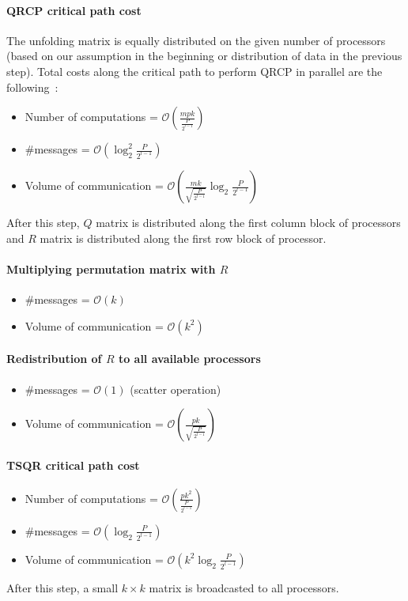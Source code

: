 \documentclass[sigconf]{acmart}
\begin{document}
\paragraph{QRCP critical path cost}
The unfolding matrix is equally distributed on the given number of processors (based on our assumption in the beginning or distribution of data in the previous step). Total costs along the critical path to perform QRCP in parallel are the following~\cite{beaupere-tournamentpivoting}:
\begin{itemize}
	\item Number of computations = $\mathcal{O}(\frac{mpk}{\frac{P}{2^{l-1}}})$
	\item \#messages = $\mathcal{O}(\log_2^2\frac{P}{2^{l-1}})$
	\item Volume of communication = $\mathcal{O}(\frac{mk}{\sqrt{\frac{P}{2^{l-1}}}} \log_2 \frac{P}{2^{l-1}} )$
\end{itemize}
After this step, $Q$ matrix is distributed along the first column block of processors and $R$ matrix is distributed along the first row block of processor.

\paragraph{Multiplying permutation matrix with $R$}
\begin{itemize}
	\item \#messages = $\mathcal{O}(k)$
	\item Volume of communication = $\mathcal{O}(k^2)$
\end{itemize}
\paragraph{Redistribution of $R$ to all available processors}
\begin{itemize}
	\item \#messages = $\mathcal{O}(1)$ (scatter operation)
	\item Volume of communication = $\mathcal{O}(\frac{pk}{\sqrt{\frac{P}{2^{l-1}}}})$ 
\end{itemize}
\paragraph{TSQR critical path cost}
\begin{itemize}
	\item Number of computations = $\mathcal{O}(\frac{pk^2}{\frac{P}{2^{l-1}}})$
	\item \#messages = $\mathcal{O}(\log_2 \frac{P}{2^{l-1}})$
	\item Volume of communication = $\mathcal{O}(k^2 \log_2 \frac{P}{2^{l-1}})$ 
\end{itemize}
After this step, a small $k\times k$ matrix is broadcasted to all processors.
\end{document}
